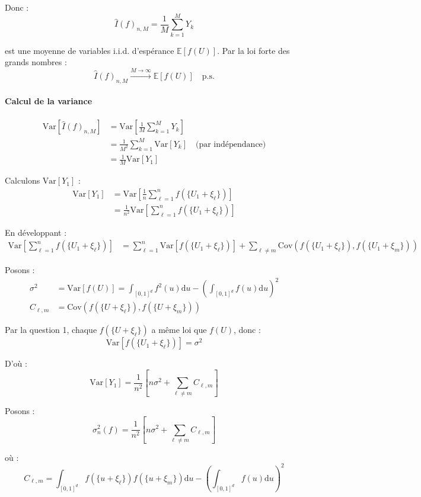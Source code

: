 \documentclass[12pt,a4paper]{article}
\theoremstyle{definition}
\theoremstyle{remark}
\newcommand{\E}{\mathbb{E}}
\newcommand{\Var}{\text{Var}}
\newcommand{\dd}{\mathrm{d}}
\begin{document}
Donc :
\[
\hat{I}(f)_{n,M} = \frac{1}{M}\sum_{k=1}^M Y_k
\]

est une moyenne de variables i.i.d. d'espérance $\E[f(U)]$. Par la loi forte des grands nombres :
\[
\hat{I}(f)_{n,M} \xrightarrow{M \to \infty} \E[f(U)] \quad \text{p.s.}
\]

\paragraph{Calcul de la variance}

\begin{align*}
\Var[\hat{I}(f)_{n,M}] &= \Var\left[\frac{1}{M}\sum_{k=1}^M Y_k\right] \\
&= \frac{1}{M^2}\sum_{k=1}^M \Var[Y_k] \quad \text{(par indépendance)} \\
&= \frac{1}{M}\Var[Y_1]
\end{align*}

Calculons $\Var[Y_1]$ :
\begin{align*}
\Var[Y_1] &= \Var\left[\frac{1}{n}\sum_{\ell=1}^n f(\{U_1 + \xi_\ell\})\right] \\
&= \frac{1}{n^2}\Var\left[\sum_{\ell=1}^n f(\{U_1 + \xi_\ell\})\right]
\end{align*}

En développant :
\begin{align*}
\Var\left[\sum_{\ell=1}^n f(\{U_1 + \xi_\ell\})\right] &= \sum_{\ell=1}^n \Var[f(\{U_1 + \xi_\ell\})] + \sum_{\ell \neq m} \text{Cov}(f(\{U_1 + \xi_\ell\}), f(\{U_1 + \xi_m\}))
\end{align*}

Posons :
\begin{align*}
\sigma^2 &= \Var[f(U)] = \int_{[0,1]^d} f^2(u)\dd u - \left(\int_{[0,1]^d} f(u)\dd u\right)^2 \\
C_{\ell,m} &= \text{Cov}(f(\{U + \xi_\ell\}), f(\{U + \xi_m\}))
\end{align*}

Par la question 1, chaque $f(\{U + \xi_\ell\})$ a même loi que $f(U)$, donc :
\[
\Var[f(\{U_1 + \xi_\ell\})] = \sigma^2
\]

D'où :
\[
\Var[Y_1] = \frac{1}{n^2}\left[n\sigma^2 + \sum_{\ell \neq m} C_{\ell,m}\right]
\]

Posons :
\[
\boxed{\sigma_n^2(f) = \frac{1}{n^2}\left[n\sigma^2 + \sum_{\ell \neq m} C_{\ell,m}\right]}
\]

où :
\[
C_{\ell,m} = \int_{[0,1]^d} f(\{u + \xi_\ell\})f(\{u + \xi_m\})\dd u - \left(\int_{[0,1]^d} f(u)\dd u\right)^2
\]
\end{document}
